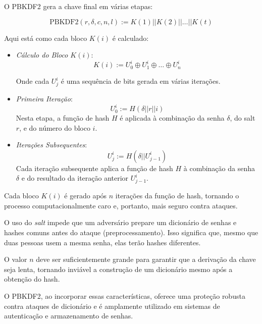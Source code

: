 O PBKDF2 gera a chave final em várias etapas:

\begin{displaymath}
  \text{PBKDF2}(r, \delta, c, n, l) := K(1) || K(2) || \dots || K(t)
\end{displaymath}

Aqui está como cada bloco $K(i)$ é calculado:

\begin{itemize}
    \item[] {\em Cálculo do Bloco $K(i)$}:
    \begin{displaymath}
    K(i) := U_0^i \oplus U_1^i \oplus \dots \oplus U_n^i
    \end{displaymath}
    
    Onde cada $U_j^i$ é uma sequência de bits gerada em várias iterações.

    \item[] {\em Primeira Iteração}:
    \begin{displaymath}
    U_0^i := H(\delta || r || i)
    \end{displaymath}
    Nesta etapa, a função de hash $H$ é aplicada à combinação da senha $\delta$, do salt $r$, e do número do bloco $i$.

    \item[] {\em Iterações Subsequentes}:
    \begin{displaymath}
    U_j^i := H(\delta || U_{j-1}^i)
    \end{displaymath}
    Cada iteração subsequente aplica a função de hash $H$ à combinação da senha $\delta$ e do resultado da iteração anterior $U_{j-1}^i$.
\end{itemize}

Cada bloco $K(i)$ é gerado após $n$ iterações da função de hash, tornando o processo computacionalmente caro e, portanto, mais seguro contra ataques.

O uso do {\em salt} impede que um adversário prepare um dicionário de senhas e hashes comuns antes do ataque (preprocessamento).
Isso significa que, mesmo que duas pessoas usem a mesma senha, elas terão hashes diferentes.

O valor $n$ deve ser suficientemente grande para garantir que a derivação da chave seja lenta, tornando inviável a construção de um dicionário mesmo após a obtenção do hash.

O PBKDF2, ao incorporar essas características, oferece uma proteção robusta contra ataques de dicionário e é amplamente utilizado em sistemas de autenticação e armazenamento de senhas.

